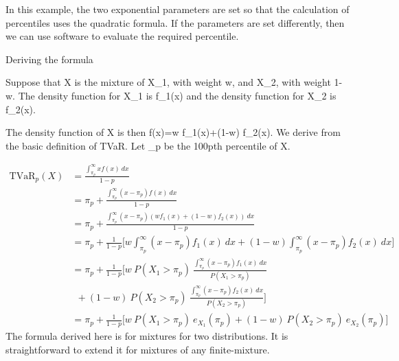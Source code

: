 In this example, the two exponential parameters are set so that the calculation of percentiles uses the quadratic formula. 
If the parameters are set differently, then we can use software to evaluate the required percentile.


Deriving the formula

Suppose that X is the mixture of X_1, with weight w, and X_2, with weight 1-w. The density function for X_1 is f_1(x) and the density function for X_2 is f_2(x). 

The density function of X is then f(x)=w f_1(x)+(1-w) f_2(x). We derive from the basic definition of TVaR. Let \pi_p be the 100pth percentile of X.

 \begin{eqnarray*} 
\text{TVaR}_p(X)
&=\frac{\int_{\pi_p}^\infty x f(x) \ dx}{1-p}\\
&=\pi_p+\frac{\int_{\pi_p}^\infty (x-\pi_p) f(x) \ dx}{1-p} \\
&=\pi_p+\frac{\int_{\pi_p}^\infty (x-\pi_p) (w f_1(x)+(1-w) f_2(x)) \ dx}{1-p} \\
&=\pi_p+\frac{1}{1-p} \biggl[w \int_{\pi_p}^\infty (x-\pi_p) f_1(x) \ dx +(1-w) \int_{\pi_p}^\infty (x-\pi_p) f_2(x) \ dx\biggr] \\
&=\pi_p+\frac{1}{1-p} \biggl[w \   P(X_1>\pi_p) \ \frac{\int_{\pi_p}^\infty (x-\pi_p) f_1(x) \ dx}{P(X_1>\pi_p)}\\
& \ \  +(1-w) \ P(X_2>\pi_p) \ \frac{\int_{\pi_p}^\infty (x-\pi_p) f_2(x) \ dx}{P(X_2>\pi_p)} \biggr] \\
&=\pi_p+\frac{1}{1-p} \biggl[w \   P(X_1>\pi_p) \ e_{X_1}(\pi_p) +(1-w) \ P(X_2>\pi_p) \ e_{X_2}(\pi_p) \biggr] 
\end{eqnarray*}
The formula derived here is for mixtures for two distributions. 
It is straightforward to extend it for mixtures of any finite-mixture.

